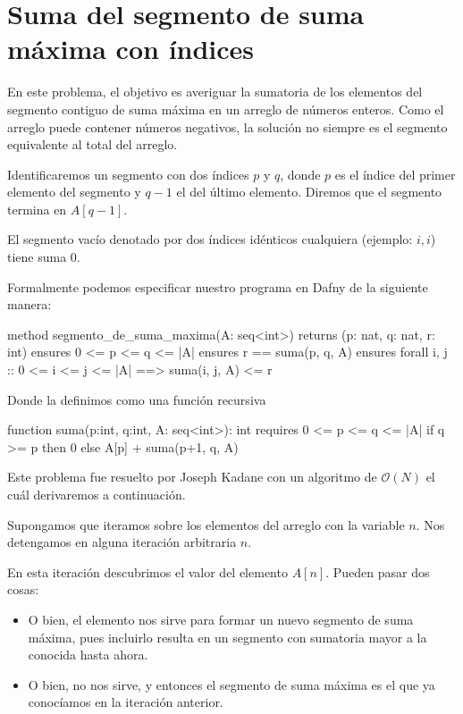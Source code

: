\documentclass[12pt, a4paper, openany, fleqn]{book}
\begin{document}
    \section{Suma del segmento de suma máxima con índices}
    En este problema, el objetivo es averiguar la sumatoria de los elementos del segmento contiguo de suma máxima en un arreglo de números enteros.
    Como el arreglo puede contener números negativos, la solución no siempre es el segmento equivalente al total del arreglo.

    Identificaremos un segmento con dos índices $p$ y $q$, donde $p$ es el índice del primer elemento del segmento y $q-1$ el del último elemento. Diremos que el segmento termina en $A[q-1]$.

    El segmento vacío denotado por dos índices idénticos cualquiera (ejemplo: $i,i$) tiene suma 0.

    Formalmente podemos especificar nuestro programa en Dafny de la siguiente manera:

    \begin{dafny}
    method segmento_de_suma_maxima(A: seq<int>)
        returns (p: nat, q: nat, r: int)
        ensures 0 <= p <= q <= |A|
        ensures r == suma(p, q, A)
        ensures forall i, j :: 0 <= i <= j <= |A| ==> suma(i, j, A) <= r
    {
    }
    \end{dafny}

    Donde  la definimos como una función recursiva

    \begin{dafny}
    function suma(p:int, q:int, A: seq<int>): int
        requires 0 <= p <= q <= |A|
    {
        if q >= p then 0 else A[p] + suma(p+1, q, A)
    }
    \end{dafny}

    Este problema fue resuelto por Joseph Kadane con un algoritmo de $\mathcal{O}(N)$ el cuál derivaremos a continuación.

    Supongamos que iteramos sobre los elementos del arreglo con la variable $n$. Nos detengamos en alguna iteración arbitraria $n$.

    En esta iteración descubrimos el valor del elemento $A[n]$. Pueden pasar dos cosas:
    \begin{itemize}
        \item O bien, el elemento nos sirve para formar un nuevo segmento de suma máxima, pues incluirlo resulta en un segmento con sumatoria mayor a la conocida hasta ahora.
        \item O bien, no nos sirve, y entonces el segmento de suma máxima es el que ya conocíamos en la iteración anterior.
    \end{itemize}
\end{document}
